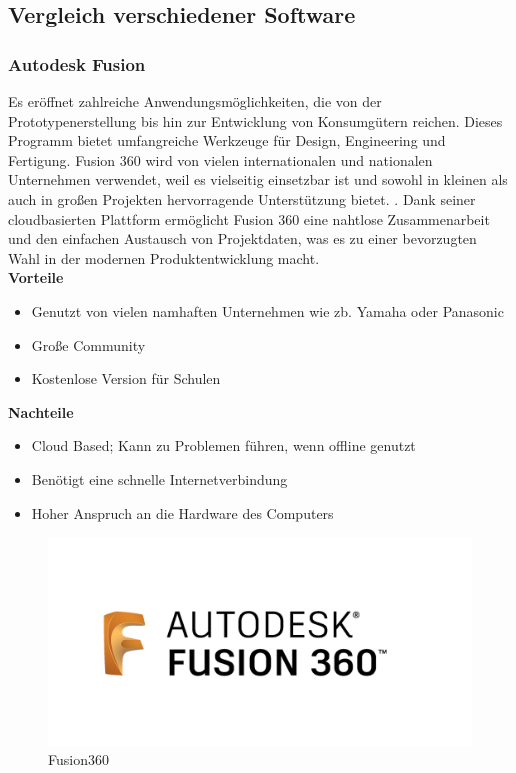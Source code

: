 \subsection{Vergleich verschiedener Software}

\subsubsection{Autodesk Fusion}
Es eröffnet zahlreiche Anwendungsmöglichkeiten, die von der Prototypenerstellung bis hin zur Entwicklung von Konsumgütern reichen. Dieses Programm bietet umfangreiche Werkzeuge für Design, Engineering und Fertigung.  Fusion 360 wird von vielen internationalen und nationalen Unternehmen verwendet, weil es vielseitig einsetzbar ist und sowohl in kleinen als auch in großen Projekten hervorragende Unterstützung bietet. \parencite{AutodeskFusion}. Dank seiner cloudbasierten Plattform ermöglicht Fusion 360 eine nahtlose Zusammenarbeit und den einfachen Austausch von Projektdaten, was es zu einer bevorzugten Wahl in der modernen Produktentwicklung macht. \\

\textbf{Vorteile}
\begin{itemize}
	\item Genutzt von vielen namhaften Unternehmen wie zb. Yamaha oder Panasonic
	\item Große Community
	\item Kostenlose Version für Schulen \parencite{AutodeskFusionReviews}
\end{itemize} 

\textbf{Nachteile}
\begin{itemize}
	\item Cloud Based; Kann zu Problemen führen, wenn offline genutzt 
	\item Benötigt eine schnelle Internetverbindung
	\item Hoher Anspruch an die Hardware des Computers \parencite{AutodeskFusionReviews}
\end{itemize}

\begin{figure}[H]
	\centering
	\includegraphics[width=0.3\linewidth]{images/Fusion360.png}
	\caption[Fusion360]{Fusion360}
	\label{fig:Autodesk Fusion}
\end{figure}



